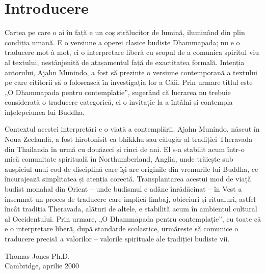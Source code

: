 
\chapter{Introducere}

Cartea pe care o ai în față e un coș strălucitor de lumină, iluminând din plin condiția umană. E o versiune a operei clasice budiste Dhammapada; nu e o traducere mot à mot, ci o interpretare liberă cu scopul de a comunica spiritul viu al textului, nestânjenită de atașamentul față de exactitatea formală. Intenția autorului, Ajahn Munindo, a fost să prezinte o versiune contemporană a textului pe care cititorii să o folosească în investigația lor a Căii. Prin urmare titlul este „O Dhammapada pentru contemplație”, sugerând că lucrarea nu trebuie considerată o traducere categorică, ci o invitație la a întâlni și contempla înțelepciunea lui Buddha.

Contextul acestei interpretări e o viață a contemplării. Ajahn Munindo, născut în Noua Zeelandă, a fost hirotonisit ca bhikkhu sau călugăr al tradiției Theravada din Thailanda în urmă cu douăzeci și cinci de ani. El s-a stabilit acum într-o mică comunitate spirituală în Northumberland, Anglia, unde trăiește sub auspiciul unui cod de disciplină care își are originile din vremurile lui Buddha, ce încurajează simplitatea și atenția corectă. Transplantarea acestui mod de viață budist monahal din Orient – unde budismul e adânc înrădăcinat – în Vest a însemnat un proces de traducere care implică limbaj, obiceiuri și ritualuri, astfel încât tradiția Theravada, alături de altele, e stabilită acum în ambientul cultural al Occidentului. Prin urmare, „O Dhammapada pentru contemplație”, cu toate că e o interpretare liberă, după standarde scolastice, urmărește să comunice o traducere precisă a valorilor – valorile spirituale ale tradiției budiste vii.

\bigskip

{\raggedleft
Thomas Jones Ph.D.\\
Cambridge, aprilie 2000
\par}
